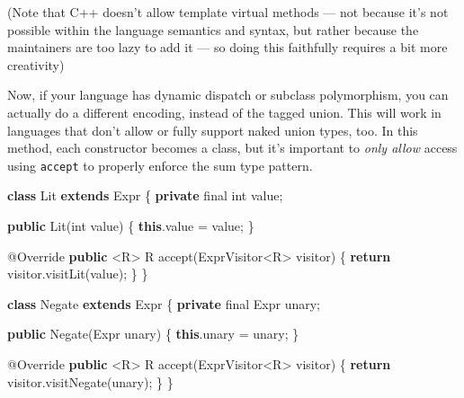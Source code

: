 \documentclass[]{article}
\newenvironment{Shaded}{}{}
\newcommand{\AttributeTok}[1]{\textcolor[rgb]{0.49,0.56,0.16}{#1}}
\newcommand{\ControlFlowTok}[1]{\textcolor[rgb]{0.00,0.44,0.13}{\textbf{#1}}}
\newcommand{\DataTypeTok}[1]{\textcolor[rgb]{0.56,0.13,0.00}{#1}}
\newcommand{\FunctionTok}[1]{\textcolor[rgb]{0.02,0.16,0.49}{#1}}
\newcommand{\KeywordTok}[1]{\textcolor[rgb]{0.00,0.44,0.13}{\textbf{#1}}}
\newcommand{\NormalTok}[1]{#1}
\newcommand{\OperatorTok}[1]{\textcolor[rgb]{0.40,0.40,0.40}{#1}}
\begin{document}
(Note that C++ doesn't allow template virtual methods --- not because it's not
possible within the language semantics and syntax, but rather because the
maintainers are too lazy to add it --- so doing this faithfully requires a bit
more creativity)

Now, if your language has dynamic dispatch or subclass polymorphism, you can
actually do a different encoding, instead of the tagged union. This will work in
languages that don't allow or fully support naked union types, too. In this
method, each constructor becomes a class, but it's important to \emph{only
allow} access using \texttt{accept} to properly enforce the sum type pattern.

\begin{Shaded}
\begin{Highlighting}[]
\KeywordTok{class}\NormalTok{ Lit }\KeywordTok{extends}\NormalTok{ Expr }\OperatorTok{\{}
    \KeywordTok{private} \DataTypeTok{final} \DataTypeTok{int}\NormalTok{ value}\OperatorTok{;}

    \KeywordTok{public} \FunctionTok{Lit}\OperatorTok{(}\DataTypeTok{int}\NormalTok{ value}\OperatorTok{)} \OperatorTok{\{}
        \KeywordTok{this}\OperatorTok{.}\FunctionTok{value} \OperatorTok{=}\NormalTok{ value}\OperatorTok{;}
    \OperatorTok{\}}

    \AttributeTok{@Override}
    \KeywordTok{public} \OperatorTok{\textless{}}\NormalTok{R}\OperatorTok{\textgreater{}}\NormalTok{ R }\FunctionTok{accept}\OperatorTok{(}\NormalTok{ExprVisitor}\OperatorTok{\textless{}}\NormalTok{R}\OperatorTok{\textgreater{}}\NormalTok{ visitor}\OperatorTok{)} \OperatorTok{\{}
        \ControlFlowTok{return}\NormalTok{ visitor}\OperatorTok{.}\FunctionTok{visitLit}\OperatorTok{(}\NormalTok{value}\OperatorTok{);}
    \OperatorTok{\}}
\OperatorTok{\}}

\KeywordTok{class}\NormalTok{ Negate }\KeywordTok{extends}\NormalTok{ Expr }\OperatorTok{\{}
    \KeywordTok{private} \DataTypeTok{final}\NormalTok{ Expr unary}\OperatorTok{;}

    \KeywordTok{public} \FunctionTok{Negate}\OperatorTok{(}\NormalTok{Expr unary}\OperatorTok{)} \OperatorTok{\{} \KeywordTok{this}\OperatorTok{.}\FunctionTok{unary} \OperatorTok{=}\NormalTok{ unary}\OperatorTok{;} \OperatorTok{\}}

    \AttributeTok{@Override}
    \KeywordTok{public} \OperatorTok{\textless{}}\NormalTok{R}\OperatorTok{\textgreater{}}\NormalTok{ R }\FunctionTok{accept}\OperatorTok{(}\NormalTok{ExprVisitor}\OperatorTok{\textless{}}\NormalTok{R}\OperatorTok{\textgreater{}}\NormalTok{ visitor}\OperatorTok{)} \OperatorTok{\{}
        \ControlFlowTok{return}\NormalTok{ visitor}\OperatorTok{.}\FunctionTok{visitNegate}\OperatorTok{(}\NormalTok{unary}\OperatorTok{);}
    \OperatorTok{\}}
\OperatorTok{\}}


\end{Highlighting}
\end{Shaded}
\end{document}
